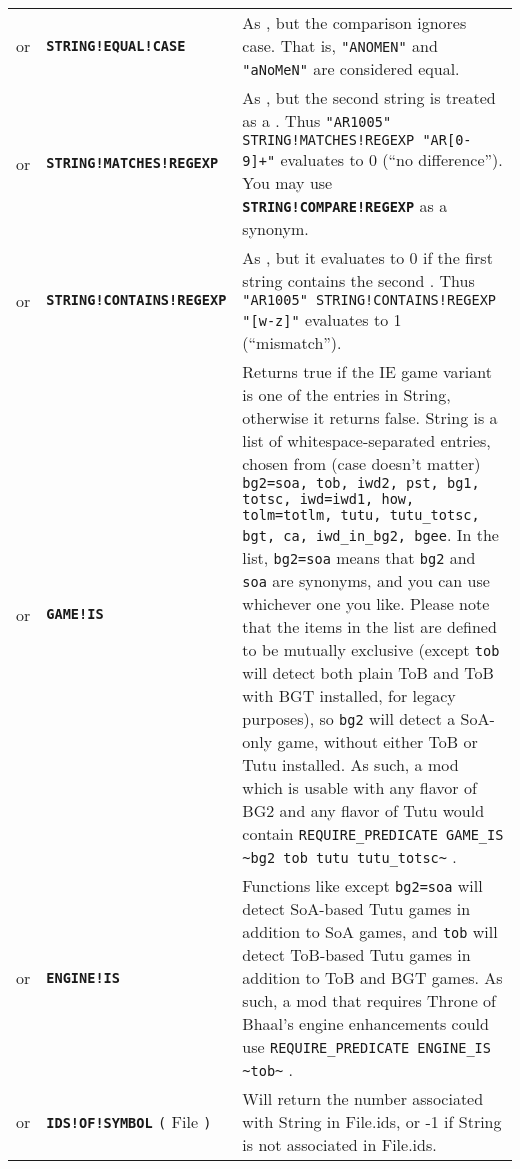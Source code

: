 \documentclass{article}
\def\ttref#1{\ahrefloc{#1}{\tt #1}}
\def\DEFINE#1{{\tt \bf #1}\label{#1}\index{#1}}
\def\t#1{{\tt #1}}
\begin{document}
\begin{tabular}{cp{10in}|p{10in}}
or & \ttref{String} \DEFINE{STRING!EQUAL!CASE} \ttref{String} &
As \ttref{STRING!EQUAL}, but the comparison ignores case. That is,
\t{"ANOMEN"} and \t{"aNoMeN"} are considered equal.\\

or & \ttref{String} \DEFINE{STRING!MATCHES!REGEXP} \ttref{String} &
As \ttref{STRING!COMPARE!CASE}, but the second string is treated as a
\ttref{regexp}. Thus \t{"AR1005" STRING!MATCHES!REGEXP "AR[0-9]+"}
evaluates to 0 (``no difference''). You may use
\DEFINE{STRING!COMPARE!REGEXP} as a synonym. \\

or & \ttref{String} \DEFINE{STRING!CONTAINS!REGEXP} \ttref{String} &
As \ttref{STRING!MATCHES!REGEXP}, but it evaluates to 0 if the first string
contains the second \ttref{regexp}. Thus \t{"AR1005" STRING!CONTAINS!REGEXP
"[w-z]"} evaluates to 1 (``mismatch''). \\

or & \DEFINE{GAME!IS} \ttref{String} & Returns true if the IE game variant
is one of the entries in String, otherwise it returns false. String is a list of
whitespace-separated entries, chosen from (case doesn't matter)
\verb+bg2=soa, tob, iwd2, pst, bg1, totsc, iwd=iwd1, how, tolm=totlm, tutu, tutu_totsc, bgt, ca, iwd_in_bg2, bgee+.
In the list, \verb+bg2=soa+ means that \verb+bg2+ and \verb+soa+ are synonyms,
and you can use whichever one you like. Please note that the items in the list are
defined to be mutually exclusive (except \verb+tob+ will detect both plain ToB
and ToB with BGT installed, for legacy purposes), so \verb+bg2+ will detect a
SoA-only game, without either ToB or Tutu installed. As such, a mod which is
usable with any flavor of BG2 and any flavor of Tutu would contain
\verb+REQUIRE_PREDICATE GAME_IS ~bg2 tob tutu tutu_totsc~+ . \\

or & \DEFINE{ENGINE!IS} \ttref{String} & Functions like \ttref{GAME!IS}
except \verb+bg2=soa+ will detect SoA-based Tutu games in addition to SoA games,
and \verb+tob+ will detect ToB-based Tutu games in addition to ToB and BGT games.
As such, a mod that requires Throne of Bhaal's engine enhancements could use
\verb+REQUIRE_PREDICATE ENGINE_IS ~tob~+ . \\

or & \DEFINE{IDS!OF!SYMBOL} \t{(} File \ttref{String} \t{)} &
Will return the number associated with String in File.ids,
or -1 if String is not associated in File.ids. \\


\end{tabular}
\end{document}
